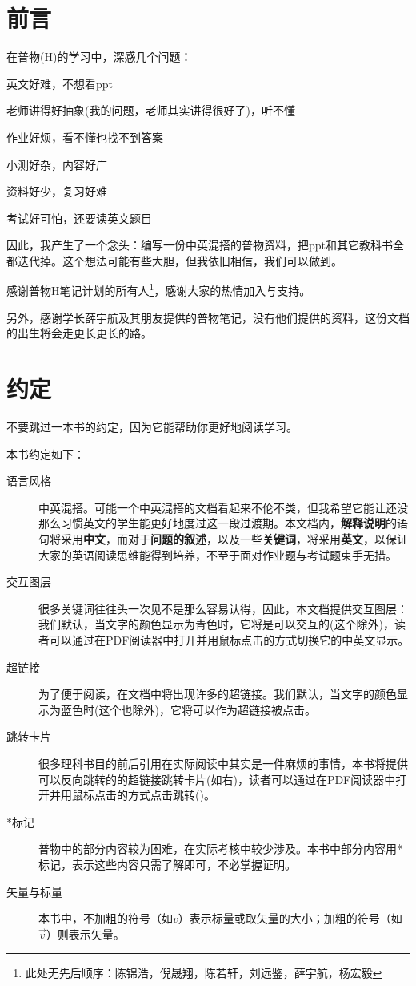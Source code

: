 	\chapter{前言}
	在普物(H)的学习中，深感几个问题：
	\begin{Itemize}
		\item 英文好难，不想看ppt
		\item 老师讲得好抽象(我的问题，老师其实讲得很好了)，听不懂
		\item 作业好烦，看不懂也找不到答案
		\item 小测好杂，内容好广
		\item 资料好少，复习好难
		\item 考试好可怕，还要读英文题目
	\end{Itemize}
	
	因此，我产生了一个念头：编写一份中英混搭的普物资料，把ppt和其它教科书全都迭代掉。这个想法可能有些大胆，但我依旧相信，我们可以做到。
	
	感谢普物H笔记计划的所有人\footnote{此处无先后顺序：陈锦浩，倪晟翔，陈若轩，刘远鉴，薛宇航，杨宏毅}，感谢大家的热情加入与支持。
	
	另外，感谢学长薛宇航及其朋友提供的普物笔记，没有他们提供的资料，这份文档的出生将会走更长更长的路。
	
	\chapter{约定}
	不要跳过一本书的约定，因为它能帮助你更好地阅读学习。
	
	本书约定如下：
	\setcounter{chapter}{-1}
	
	\begin{description}
		\item[语言风格]中英混搭。可能一个中英混搭的文档看起来不伦不类，但我希望它能让还没那么习惯英文的学生能更好地度过这一段过渡期。本文档内，\textbf{解释说明}的语句将采用\textbf{中文}，而对于\textbf{问题的叙述}，以及一些\textbf{关键词}，将采用\textbf{英文}，以保证大家的英语阅读思维能得到培养，不至于面对作业题与考试题束手无措。
		\item[交互图层] 很多关键词往往头一次见不是那么容易认得，因此，本文档提供交互图层：我们默认，当文字的颜色显示为{\color{plaincyan}青色}时，它将是可以交互的(这个除外)，读者可以通过在PDF阅读器中打开并用鼠标点击的方式切换它的中英文显示。
		\item[超链接]为了便于阅读，在文档中将出现许多的超链接。我们默认，当文字的颜色显示为{\color{blue}蓝色}时(这个也除外)，它将可以作为超链接被点击。
		\item[跳转卡片]很多理科书目的前后引用在实际阅读中其实是一件麻烦的事情，本书将提供可以反向跳转的的超链接跳转卡片(如右)，读者可以通过在PDF阅读器中打开并用鼠标点击的方式点击跳转()。
		\item[*标记]普物中的部分内容较为困难，在实际考核中较少涉及。本书中部分内容用*标记，表示这些内容只需了解即可，不必掌握证明。
		\item [矢量与标量]本书中，不加粗的符号（如$v$）表示标量或取矢量的大小；加粗的符号（如$\vec{v}$）则表示矢量。
	\end{description}
